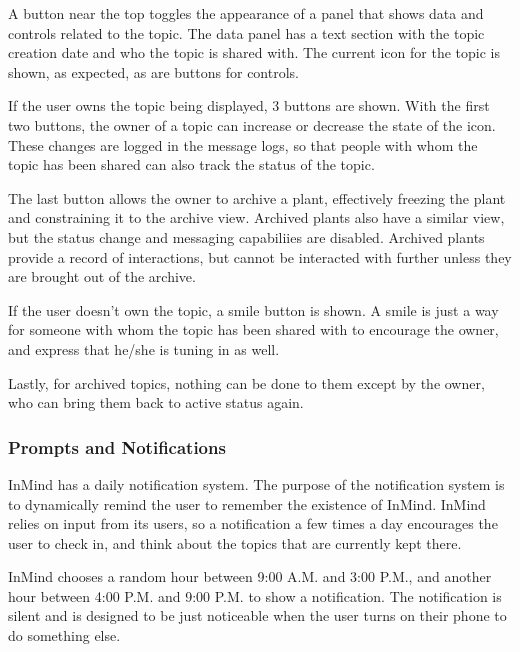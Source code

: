       A button near the top toggles the appearance of a panel that shows data and controls
      related to the topic.
      The data panel has a text section with the topic creation date and who the topic is shared with.
      The current icon for the topic is shown, as expected, as are buttons for controls.

      If the user owns the topic being displayed, 3 buttons are shown.
      With the first two buttons,
      the owner of a topic can increase or decrease the state of the icon.
      These changes are logged in the message logs,
      so that people with whom the topic has been shared
      can also track the status of the topic.

      The last button allows the owner to archive a plant,
      effectively freezing the plant and constraining it to the archive view.
      Archived plants also have a similar view,
      but the status change and messaging capabiliies are disabled.
      Archived plants provide a record of interactions,
      but cannot be interacted with further unless they are brought out of the archive.

      If the user doesn't own the topic, a smile button is shown.
      A smile is just a way for someone with whom the topic has been
      shared with to encourage the owner,
      and express that he/she is tuning in as well.

      Lastly, for archived topics,
      nothing can be done to them except by the owner,
      who can bring them back to active status again.

      \subsubsection{Prompts and Notifications}
      InMind has a daily notification system.
      The purpose of the notification system is to dynamically remind
      the user to remember the existence of InMind.
      InMind relies on input from its users,
      so a notification a few times a day encourages the user
      to check in,
      and think about the topics that are currently kept there.

      InMind chooses a random hour between 9:00 A.M. and 3:00 P.M.,
      and another hour between 4:00 P.M. and 9:00 P.M. to show a notification.
      The notification is silent and is designed to be just
      noticeable when the user turns on their phone to do something else.

